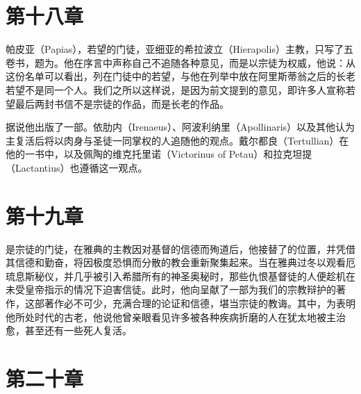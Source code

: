 
\section{第十八章}

帕皮亚（Papias），若望的门徒，亚细亚的希拉波立（Hierapolis）主教，只写了五卷书，题为。他在序言中声称自己不追随各种意见，而是以宗徒为权威，他说：从这份名单可以看出，列在门徒中的若望，与他在列举中放在阿里斯蒂翁之后的长老若望不是同一个人。我们之所以这样说，是因为前文提到的意见，即许多人宣称若望最后两封书信不是宗徒的作品，而是长老的作品。\par

据说他出版了一部。依肋内（Irenaeus）、阿波利纳里（Apollinaris）以及其他认为主复活后将以肉身与圣徒一同掌权的人追随他的观点。戴尔都良（Tertullian）在他的一书中，以及佩陶的维克托里诺（Victorinus of Petau）和拉克坦提（Lactantius）也遵循这一观点。\par


\section{第十九章}

是宗徒的门徒，在雅典的主教因对基督的信德而殉道后，他接替了的位置，并凭借其信德和勤奋，将因极度恐惧而分散的教会重新聚集起来。当在雅典过冬以观看厄琉息斯秘仪，并几乎被引入希腊所有的神圣奥秘时，那些仇恨基督徒的人便趁机在未受皇帝指示的情况下迫害信徒。此时，他向呈献了一部为我们的宗教辩护的著作，这部著作必不可少，充满合理的论证和信德，堪当宗徒的教诲。其中，为表明他所处时代的古老，他说他曾亲眼看见许多被各种疾病折磨的人在犹太地被主治愈，甚至还有一些死人复活。\par


\section{第二十章}

